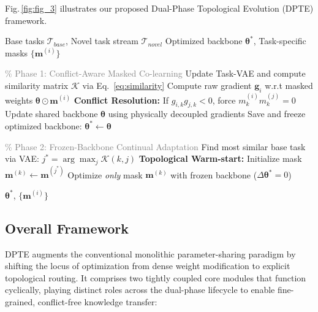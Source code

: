 \documentclass{article}
\begin{document}
Fig.\,\ref{fig:fig_3} illustrates our proposed Dual-Phase Topological Evolution (DPTE) framework. 


\renewcommand{\algorithmicrequire}{\textbf{Input:}}
\renewcommand{\algorithmicensure}{\textbf{Output:}}
\begin{algorithm}[t]
\caption{Dual-Phase Topological Evolution (DPTE)}
\label{alg:dpte}
\begin{algorithmic}[1]
\REQUIRE Base tasks $\mathcal{T}_{base}$, Novel task stream $\mathcal{T}_{novel}$
\ENSURE Optimized backbone $\bm{\theta}^*$, Task-specific masks $\{\bm{m}^{(i)}\}$

\STATE \textcolor{gray}{\% Phase 1: Conflict-Aware Masked Co-learning}
    \STATE Update Task-VAE and compute similarity matrix $\mathcal{K}$ via Eq.~\ref{eq:similarity}
        \STATE Compute raw gradient $\bm{g}_i$ w.r.t masked weights $\bm{\theta} \odot \bm{m}^{(i)}$
        \STATE \textbf{Conflict Resolution:} If $g_{i,k} g_{j,k} < 0$, force $m_k^{(i)} m_k^{(j)} = 0$ 
    \ENDFOR
    \STATE Update shared backbone $\bm{\theta}$ using physically decoupled gradients
\ENDWHILE
\STATE Save and freeze optimized backbone: $\bm{\theta}^* \leftarrow \bm{\theta}$

\STATE 
\STATE \textcolor{gray}{\% Phase 2: Frozen-Backbone Continual Adaptation}
    \STATE Find most similar base task via VAE: $j^* = \arg\max_j \mathcal{K}(k, j)$
    \STATE \textbf{Topological Warm-start:} Initialize mask $\bm{m}^{(k)} \leftarrow \bm{m}^{(j^*)}$
        \STATE Optimize \emph{only} mask $\bm{m}^{(k)}$ with frozen backbone ($\Delta \bm{\theta}^* = 0$)
    \ENDWHILE
\ENDFOR

\RETURN $\bm{\theta}^*$, $\{\bm{m}^{(i)}\}$
\end{algorithmic}
\end{algorithm}


\subsection{Overall Framework}

DPTE augments the conventional monolithic parameter-sharing paradigm by shifting the locus of optimization from dense weight modification to explicit topological routing. 
It comprises two tightly coupled core modules that function cyclically, playing distinct roles across the dual-phase lifecycle to enable fine-grained, conflict-free knowledge transfer:
\end{document}
